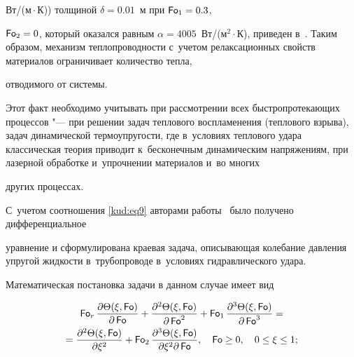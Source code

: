 Вт/(м${}\cdot{}$К)) толщиной $ \delta =0.01$~м при $\operatorname{\sf Fo}_ 1 =0.3$,

$\operatorname{\sf Fo}_2 =0$, который оказался равным $\alpha=4005$~Вт/(м$^{2}\cdot{}$К), приведен в~\cite{kud:bib12}. Таким образом, механизм теплопроводности с~учетом релаксационных свойств материалов ограничивает количество тепла,

отводимого от системы. 

Этот факт необходимо учитывать при рассмотрении всех быстропротекающих процессов "--- при решении задач теплового воспламенения (теплового взрыва), задач динамической термоупругости, где в~условиях теплового удара классическая теория приводит к~бесконечным динамическим напряжениям, при лазерной обработке и~упрочнении материалов и~во многих

других процессах.



\smallskip







 \linebreak

С~учетом соотношения \eqref{kud:eq9} авторами работы~\cite{kud:bib10} было получено дифференциальное

уравнение и сформулирована краевая задача, описывающая колебание давления упругой жидкости в~трубопроводе в~условиях гидравлического удара. 

Математическая постановка задачи в данном случае имеет вид

\begin{multline}

\label{kud:eq15}

\operatorname{\sf Fo}_r \frac{\partial  \Theta( \xi,\operatorname{\sf Fo})}{\partial \operatorname{\sf Fo}}+\frac{\partial^2 \Theta( \xi,\operatorname{\sf Fo})}{\partial

\operatorname{\sf Fo}^{2}}+\operatorname{\sf Fo}_1 \frac{\partial^3 \Theta( \xi,\operatorname{\sf Fo})}{\partial \operatorname{\sf Fo}^3}=\\

=\frac{\partial^2 \Theta( \xi,\operatorname{\sf Fo})}{\partial

 \xi^{2}}+\operatorname{\sf Fo}_2 \frac{\partial^3 \Theta( \xi,\operatorname{\sf Fo})}{\partial  \xi^2\partial

\operatorname{\sf Fo} }, \quad \operatorname{\sf Fo}\geq 0,\quad 0 \leq \xi \leq 1;

\end{multline}

